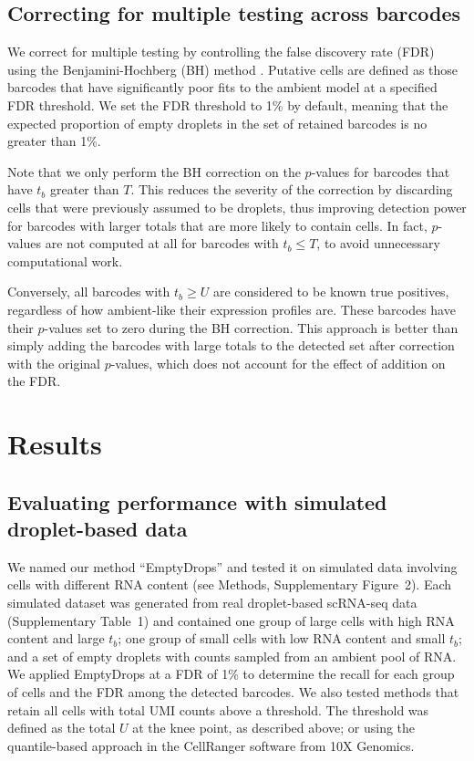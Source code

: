 \documentclass[10pt,letterpaper]{article}
\newcommand{\supptabdataset}{1}
\newcommand{\suppfigsimdesign}{2}
\begin{document}
\subsection*{Correcting for multiple testing across barcodes}
We correct for multiple testing by controlling the false discovery rate (FDR) using the Benjamini-Hochberg (BH) method \cite{benjamini1995controlling}.
Putative cells are defined as those barcodes that have significantly poor fits to the ambient model at a specified FDR threshold.
We set the FDR threshold to 1\% by default, meaning that the expected proportion of empty droplets in the set of retained barcodes is no greater than 1\%.

Note that we only perform the BH correction on the $p$-values for barcodes that have $t_b$ greater than $T$.
This reduces the severity of the correction by discarding cells that were previously assumed to be droplets, thus improving detection power for barcodes with larger totals that are more likely to contain cells.
In fact, $p$-values are not computed at all for barcodes with $t_b \le T$, to avoid unnecessary computational work.

Conversely, all barcodes with $t_b \ge U$ are considered to be known true positives, regardless of how ambient-like their expression profiles are.
These barcodes have their $p$-values set to zero during the BH correction.
This approach is better than simply adding the barcodes with large totals to the detected set after correction with the original $p$-values, which does not account for the effect of addition on the FDR.

\section*{Results}

\subsection*{Evaluating performance with simulated droplet-based data}
We named our method ``EmptyDrops'' and tested it on simulated data involving cells with different RNA content (see Methods, Supplementary Figure~\suppfigsimdesign{}).
Each simulated dataset was generated from real droplet-based scRNA-seq data (Supplementary Table~\supptabdataset{}) 
and contained one group of large cells with high RNA content and large $t_b$;
one group of small cells with low RNA content and small $t_b$; 
and a set of empty droplets with counts sampled from an ambient pool of RNA.
We applied EmptyDrops at a FDR of 1\% to determine the recall for each group of cells and the FDR among the detected barcodes.
We also tested methods that retain all cells with total UMI counts above a threshold.
The threshold was defined as the total $U$ at the knee point, as described above;
or using the quantile-based approach \cite{zheng2017massively} in the CellRanger software from 10X Genomics.
\end{document}
